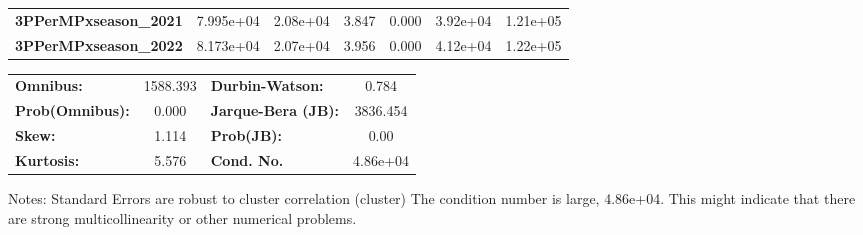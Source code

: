 \begin{center}
\begin{tabular}{lcccccc}
\textbf{3PPerMPxseason\_2021} &    7.995e+04  &     2.08e+04     &     3.847  &         0.000        &     3.92e+04    &     1.21e+05     \\
\textbf{3PPerMPxseason\_2022} &    8.173e+04  &     2.07e+04     &     3.956  &         0.000        &     4.12e+04    &     1.22e+05     \\
\bottomrule
\end{tabular}
\begin{tabular}{lclc}
\textbf{Omnibus:}       & 1588.393 & \textbf{  Durbin-Watson:     } &    0.784  \\
\textbf{Prob(Omnibus):} &   0.000  & \textbf{  Jarque-Bera (JB):  } & 3836.454  \\
\textbf{Skew:}          &   1.114  & \textbf{  Prob(JB):          } &     0.00  \\
\textbf{Kurtosis:}      &   5.576  & \textbf{  Cond. No.          } & 4.86e+04  \\
\bottomrule
\end{tabular}
\end{center}

Notes: \newline
 [1] Standard Errors are robust to cluster correlation (cluster) \newline
 [2] The condition number is large, 4.86e+04. This might indicate that there are \newline
 strong multicollinearity or other numerical problems.